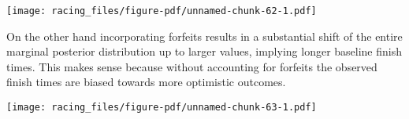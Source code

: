\documentclass[
  letterpaper,
  DIV=11,
  numbers=noendperiod]{scrartcl}
\newenvironment{Shaded}{\begin{snugshade}}{\end{snugshade}}
\newcommand{\AttributeTok}[1]{\textcolor[rgb]{0.40,0.45,0.13}{#1}}
\newcommand{\ConstantTok}[1]{\textcolor[rgb]{0.56,0.35,0.01}{#1}}
\newcommand{\DecValTok}[1]{\textcolor[rgb]{0.68,0.00,0.00}{#1}}
\newcommand{\FloatTok}[1]{\textcolor[rgb]{0.68,0.00,0.00}{#1}}
\newcommand{\FunctionTok}[1]{\textcolor[rgb]{0.28,0.35,0.67}{#1}}
\newcommand{\NormalTok}[1]{\textcolor[rgb]{0.00,0.23,0.31}{#1}}
\newcommand{\SpecialCharTok}[1]{\textcolor[rgb]{0.37,0.37,0.37}{#1}}
\newcommand{\StringTok}[1]{\textcolor[rgb]{0.13,0.47,0.30}{#1}}
\begin{document}
\texttt{[image: racing\_files/figure-pdf/unnamed-chunk-62-1.pdf]}

On the other hand incorporating forfeits results in a substantial shift
of the entire marginal posterior distribution up to larger values,
implying longer baseline finish times. This makes sense because without
accounting for forfeits the observed finish times are biased towards
more optimistic outcomes.

\begin{Shaded}
\end{Shaded}

\texttt{[image: racing\_files/figure-pdf/unnamed-chunk-63-1.pdf]}
\end{document}
